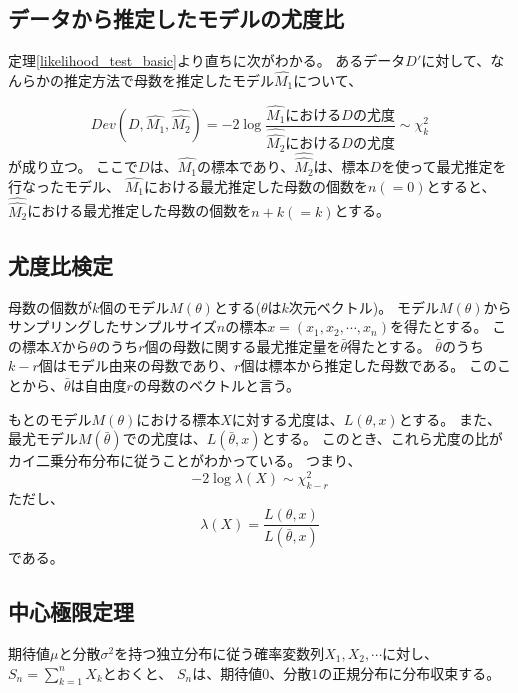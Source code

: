 \subsection{データから推定したモデルの尤度比}
定理\ref{likelihood_test_basic}より直ちに次がわかる。
あるデータ$D'$に対して、なんらかの推定方法で母数を推定したモデル$\hat{M_1}$について、
\begin{lemm} \label{likelihood_test_estimated_model}
 \begin{equation*}
  Dev(D,\hat{M_1},\hat{\hat{M_2}}) = -2\log\frac{\hat{M_1}におけるDの尤度}{\hat{\hat{M_2}}におけるDの尤度} \sim \chi^2_{k}
 \end{equation*}
が成り立つ。
ここで$D$は、$\hat{M_1}$の標本であり、$\hat{\hat{M_2}}$は、標本$D$を使って最尤推定を行なったモデル、
$\hat{M_1}$における最尤推定した母数の個数を$n(=0)$とすると、$\hat{\hat{M_2}}$における最尤推定した母数の個数を$n+k(=k)$とする。
\end{lemm}

\subsection{尤度比検定}
母数の個数が$k$個のモデル$M(\theta)$とする($\theta$は$k$次元ベクトル)。
モデル$M(\theta)$からサンプリングしたサンプルサイズ$n$の標本$x=(x_1,x_2,\cdots,x_n)$を得たとする。
この標本$X$から$\theta$のうち$r$個の母数に関する最尤推定量を$\bar{\theta}$得たとする。
$\bar{\theta}$のうち$k-r$個はモデル由来の母数であり、$r$個は標本から推定した母数である。
このことから、$\bar{\theta}$は自由度$r$の母数のベクトルと言う。

もとのモデル$M(\theta)$における標本$X$に対する尤度は、$L(\theta,x)$とする。
また、最尤モデル$M(\bar{\theta})$での尤度は、$L(\bar{\theta},x)$とする。
このとき、これら尤度の比がカイ二乗分布分布に従うことがわかっている。
つまり、
\begin{equation*}
    -2\log\lambda(X)\sim \chi^2_{k-r}
\end{equation*}
ただし、
\begin{equation*}
    \lambda(X) = \frac{L(\theta,x)}{L(\bar{\theta},x)} 
\end{equation*}
である。


\subsection{中心極限定理}
\begin{theo}[中心極限定理]
    期待値$\mu$と分散$\sigma^2$を持つ独立分布に従う確率変数列$X_1,X_2,\cdots$に対し、$S_n=\sum_{k=1}^nX_k$とおくと、
    $S_n$は、期待値$0$、分散$1$の正規分布に分布収束する。
\end{theo}

